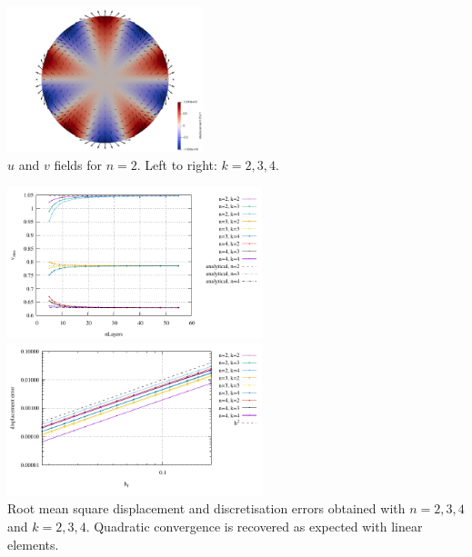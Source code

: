 \begin{center}
\includegraphics[width=5.7cm]{python_codes/fieldstone_111/results/v_k4}\\
{\captionfont $u$ and $v$ fields for $n=2$. Left to right: $k=2,3,4$.}
\end{center}

\begin{center}
\includegraphics[width=7.4cm]{python_codes/fieldstone_111/results/vrms.pdf}
\includegraphics[width=7.4cm]{python_codes/fieldstone_111/results/errors.pdf}\\
{\captionfont Root mean square displacement and discretisation 
errors obtained with $n=2,3,4$ and $k=2,3,4$. Quadratic convergence 
is recovered as expected with linear elements.}
\end{center}

\newpage

